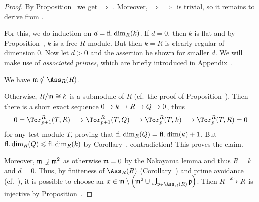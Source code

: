 \documentclass[a4paper,parskip=half,numbers=enddot, DIV=12]{scrreprt}
\renewcommand{\leq}{\leqslant}
\begin{document}
\begin{proof}
	By Proposition~ we get  $\Rightarrow$ . Moreover,  $\Rightarrow$  $\Rightarrow$  is trivial, so it remains to derive  from .
	
	For this, we do induction on $d=\operatorname{fl.dim}_R(k)$. If $d=0$, then $k$ is flat and by Proposition~, $k$ is a free $R$-module. But then $k=R$ is clearly regular of dimension $0$. Now let $d>0$ and the assertion be shown for smaller $d$. We will make use of \emph{associated primes}, which are briefly introduced in Appendix~. 
	\begin{claim}
		We have $\mm\notin\Ass_R(R)$.
	\end{claim}
	Otherwise, $R/\mathfrak{m}\cong k$ is a submodule of $R$ (cf.\ the proof of Proposition~). Then there is a short exact sequence $0\morphism k\morphism R\morphism Q\morphism 0$, thus
	\begin{align*}
		0=\Tor_{p+1}^R(T,R)\morphism\Tor_{p+1}^R(T,Q)\morphism\Tor_p^R(T,k)\morphism\Tor_p^R(T,R)=0
	\end{align*}
	for any test module $T$, proving that $\operatorname{fl.dim}_R(Q)=\operatorname{fl.dim} (k)+1$. But $\fdim_R(Q)\leq\fdim_R(k)$ by Corollary~, contradiction! This proves the claim.
	
	Moreover, $\mathfrak{m}\supsetneq\mathfrak{m}^2$ as otherwise $\mathfrak{m}=0$ by the Nakayama lemma and thus $R=k$ and $d=0$. Thus, by finiteness of $\Ass_R(R)$ (Corollary~) and prime avoidance (cf.\ \cite[Lemma~2.5.1]{alg1}), it is possible to choose an $x\in\mm\setminus \left(\mm^2\cup\bigcup_{\pp\in\Ass_R(R)}\pp\right)$. Then $R\morphism[x\cdot]R$ is injective by Proposition~. 
	

\end{proof}
\end{document}
